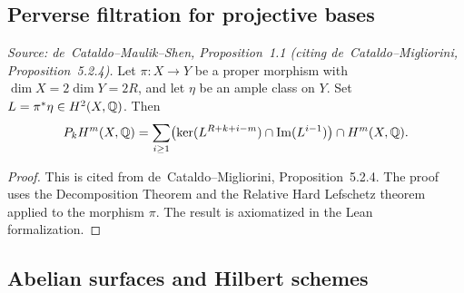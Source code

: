\subsection{Perverse filtration for projective bases}

\begin{proposition}
  \label{prop:perv_ample}
  \textit{Source: de~Cataldo--Maulik--Shen, Proposition~1.1 (citing
  de~Cataldo--Migliorini, Proposition~5.2.4).}
  Let \(\pi \colon X \to Y\) be a proper morphism with
  \(\dim X = 2\dim Y = 2R\), and let \(\eta\) be an ample class on \(Y\).
  Set \(L = \pi^* \eta \in H^2(X,\mathbb{Q})\).  Then
  \[
    P_k H^m(X,\mathbb{Q})
      = \sum_{i \geq 1}
        \bigl(\ker(L^{R+k+i-m}) \cap \operatorname{Im}(L^{i-1})\bigr)
        \cap H^m(X,\mathbb{Q}).
  \]
\end{proposition}

\begin{proof}
  \uses{}
  This is cited from de~Cataldo--Migliorini, Proposition~5.2.4.  The proof
  uses the Decomposition Theorem and the Relative Hard Lefschetz theorem
  applied to the morphism \(\pi\).  The result is axiomatized in the Lean
  formalization.
\end{proof}

\subsection{Abelian surfaces and Hilbert schemes}

